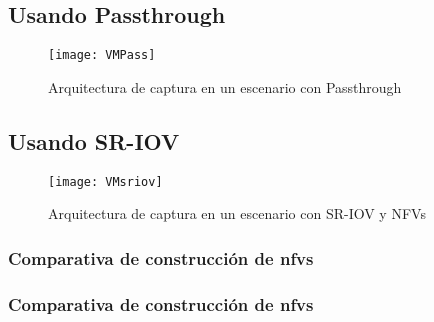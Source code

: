 

\subsection{Usando Passthrough\label{sec:pt}}

\begin{figure}[!htb]
\centering
\texttt{[image: VMPass]}
\caption{Arquitectura de captura en un escenario con Passthrough} 
\label{fig:vmpass}
\end{figure}

\subsection{Usando SR-IOV\label{sec:sriov}}

\begin{figure}[!htb]
\centering
\texttt{[image: VMsriov]}
\caption{Arquitectura de captura en un escenario con SR-IOV y NFVs}
\label{fig:vmsriov} 
\end{figure}


\subsubsection{Comparativa de construcción de \glspl{nfv}}


\subsubsection{Comparativa de construcción de \glspl{nfv}}
